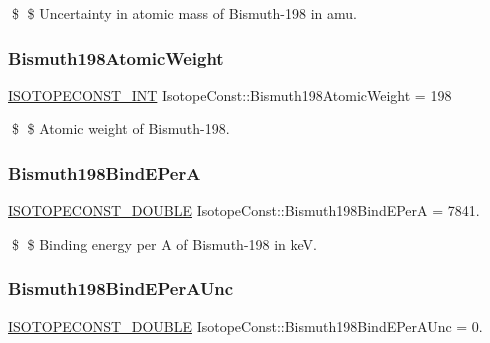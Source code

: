 \$ \$ Uncertainty in atomic mass of Bismuth-\/198 in amu. \mbox{\label{group___isotope_const-_bismuth-_bi198_ga39fff90403e2ac87411d851282840378}} 
\subsubsection{\texorpdfstring{Bismuth198\+Atomic\+Weight}{Bismuth198AtomicWeight}}
{\footnotesize\ttfamily \mbox{\hyperlink{group___isotope_const-_macros_ga5f18360b3e99483a35c32d789e62621c}{I\+S\+O\+T\+O\+P\+E\+C\+O\+N\+S\+T\+\_\+\+I\+NT}} Isotope\+Const\+::\+Bismuth198\+Atomic\+Weight = 198}

\$ \$ Atomic weight of Bismuth-\/198. \mbox{\label{group___isotope_const-_bismuth-_bi198_ga8d3264153a72ac54a9126472dfab8cc8}} 
\subsubsection{\texorpdfstring{Bismuth198\+Bind\+E\+PerA}{Bismuth198BindEPerA}}
{\footnotesize\ttfamily \mbox{\hyperlink{group___isotope_const-_macros_ga8f45a7272ce02c0b4c65c44636ed719a}{I\+S\+O\+T\+O\+P\+E\+C\+O\+N\+S\+T\+\_\+\+D\+O\+U\+B\+LE}} Isotope\+Const\+::\+Bismuth198\+Bind\+E\+PerA = 7841.}

\$ \$ Binding energy per A of Bismuth-\/198 in keV. \mbox{\label{group___isotope_const-_bismuth-_bi198_ga8b9396196b98e0597f9fbd82fa65ac27}} 
\subsubsection{\texorpdfstring{Bismuth198\+Bind\+E\+Per\+A\+Unc}{Bismuth198BindEPerAUnc}}
{\footnotesize\ttfamily \mbox{\hyperlink{group___isotope_const-_macros_ga8f45a7272ce02c0b4c65c44636ed719a}{I\+S\+O\+T\+O\+P\+E\+C\+O\+N\+S\+T\+\_\+\+D\+O\+U\+B\+LE}} Isotope\+Const\+::\+Bismuth198\+Bind\+E\+Per\+A\+Unc = 0.}

